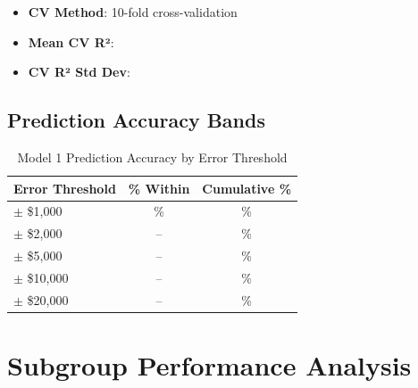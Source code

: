 \begin{itemize}
    \item \textbf{CV Method}: 10-fold cross-validation
    \item \textbf{Mean CV R²}: \ModelOneCVMean{}
    \item \textbf{CV R² Std Dev}: \ModelOneCVStd{}
\end{itemize}

\subsection{Prediction Accuracy Bands}

\begin{table}[h]
\centering
\caption{Model 1 Prediction Accuracy by Error Threshold}
\begin{tabular}{lcc}
\toprule
\textbf{Error Threshold} & \textbf{\% Within} & \textbf{Cumulative \%} \\
\midrule
$\pm$ \$1,000 & \ModelOneWithinOneK{}\% & \ModelOneWithinOneK{}\% \\
$\pm$ \$2,000 & -- & \ModelOneWithinTwoK{}\% \\
$\pm$ \$5,000 & -- & \ModelOneWithinFiveK{}\% \\
$\pm$ \$10,000 & -- & \ModelOneWithinTenK{}\% \\
$\pm$ \$20,000 & -- & \ModelOneWithinTwentyK{}\% \\
\bottomrule
\end{tabular}
\end{table}

\section{Subgroup Performance Analysis}

